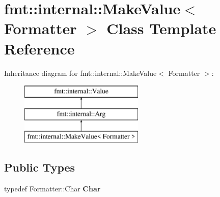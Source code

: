 \hypertarget{classfmt_1_1internal_1_1MakeValue}{}\section{fmt\+:\+:internal\+:\+:Make\+Value$<$ Formatter $>$ Class Template Reference}
\label{classfmt_1_1internal_1_1MakeValue}
Inheritance diagram for fmt\+:\+:internal\+:\+:Make\+Value$<$ Formatter $>$\+:\begin{figure}[H]
\begin{center}
\leavevmode
\includegraphics[height=3.000000cm]{classfmt_1_1internal_1_1MakeValue}
\end{center}
\end{figure}
\subsection*{Public Types}
\begin{DoxyCompactItemize}
\item 
typedef Formatter\+::\+Char {\bfseries Char}\hypertarget{classfmt_1_1internal_1_1MakeValue_a6c7944899a1c1ba1dd5102131d19c443}{}\label{classfmt_1_1internal_1_1MakeValue_a6c7944899a1c1ba1dd5102131d19c443}

\end{DoxyCompactItemize}

